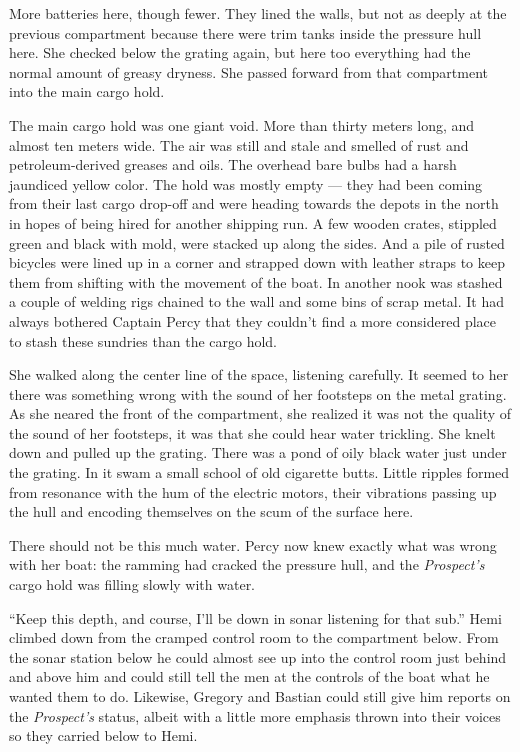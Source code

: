 \documentclass[
]{scrbook}
\begin{document}
More batteries here, though fewer. They lined the walls, but not as
deeply at the previous compartment because there were trim tanks inside
the pressure hull here. She checked below the grating again, but here
too everything had the normal amount of greasy dryness. She passed
forward from that compartment into the main cargo hold.

The main cargo hold was one giant void. More than thirty meters long,
and almost ten meters wide. The air was still and stale and smelled of
rust and petroleum-derived greases and oils. The overhead bare bulbs had
a harsh jaundiced yellow color. The hold was mostly empty --- they had
been coming from their last cargo drop-off and were heading towards the
depots in the north in hopes of being hired for another shipping run. A
few wooden crates, stippled green and black with mold, were stacked up
along the sides. And a pile of rusted bicycles were lined up in a corner
and strapped down with leather straps to keep them from shifting with
the movement of the boat. In another nook was stashed a couple of
welding rigs chained to the wall and some bins of scrap metal. It had
always bothered Captain Percy that they couldn't find a more considered
place to stash these sundries than the cargo hold.

She walked along the center line of the space, listening carefully. It
seemed to her there was something wrong with the sound of her footsteps
on the metal grating. As she neared the front of the compartment, she
realized it was not the quality of the sound of her footsteps, it was
that she could hear water trickling. She knelt down and pulled up the
grating. There was a pond of oily black water just under the grating. In
it swam a small school of old cigarette butts. Little ripples formed
from resonance with the hum of the electric motors, their vibrations
passing up the hull and encoding themselves on the scum of the surface
here.

There should not be this much water. Percy now knew exactly what was
wrong with her boat: the ramming had cracked the pressure hull, and the
\emph{Prospect's} cargo hold was filling slowly with water.

``Keep this depth, and course, I'll be down in sonar listening for that
sub.'' Hemi climbed down from the cramped control room to the
compartment below. From the sonar station below he could almost see up
into the control room just behind and above him and could still tell the
men at the controls of the boat what he wanted them to do. Likewise,
Gregory and Bastian could still give him reports on the
\emph{Prospect's} status, albeit with a little more emphasis thrown into
their voices so they carried below to Hemi.
\end{document}
